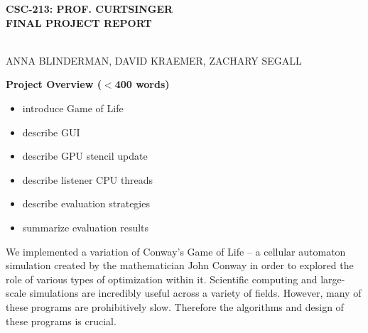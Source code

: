 \documentclass[12pt]{article}
\begin{document}
\setlength{\parindent}{3em}
\setlength{\parskip}{1em}


\newcommand{\ttspc}{\hspace{1mm}}
\newcommand{\tspc}{\hspace{2mm}}
\newcommand{\lspc}{\hspace{10mm}}
\newcommand{\ttc}{, \ttspc}
\newcommand{\nth}{^{\text{th}}}
\newcommand{\mybegit}{\vspace{-2mm} \begin{itemize} \itemsep-.6em }
\newcommand{\mytitle}[1]{\vspace{10mm} \noindent\begin{large} \textbf{{#1}} \end{large}} 
\newcommand{\soutt}[1]{%
    \renewcommand{\ULthickness}{1.0pt}%
       \sout{#1}%
    \renewcommand{\ULthickness}{.4pt}%
}



\begin{center}
\begin{Large} \textbf{CSC-213: PROF. CURTSINGER} \\
\vspace{3mm} \textbf{FINAL PROJECT REPORT} \end{Large} \\
\vspace{5mm} ANNA BLINDERMAN, DAVID KRAEMER, ZACHARY SEGALL
\end{center} 






\mytitle{Project Overview ($<$400 words)}
\mybegit
	\item introduce Game of Life
	\item describe GUI
	\item describe GPU stencil update
	\item describe listener CPU threads
	\item describe evaluation strategies
	\item summarize evaluation results
\end{itemize}

	We implemented a variation of Conway's Game of Life -- a cellular automaton simulation created by the mathematician John Conway in order to explored the role of various types of optimization within it. Scientific computing and large-scale simulations are incredibly useful across a variety of fields. However, many of these programs are prohibitively slow. Therefore the algorithms and design of these programs is crucial.
	
\end{document}
